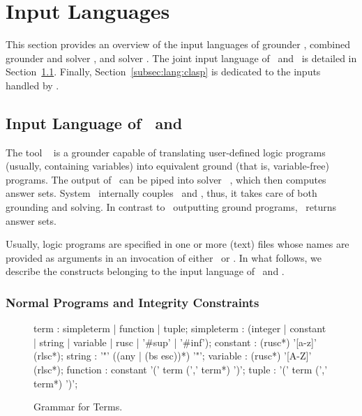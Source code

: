 \section{Input Languages}\label{sec:language}

This section provides an overview of the input languages of
grounder \gringo, combined grounder and solver \clingo, and solver \clasp.
The joint input language of \gringo\ and \clingo\ is detailed in
Section~\ref{subsec:lang:gringo}.
Finally, Section~\ref{subsec:lang:clasp} is dedicated to the inputs handled by \clasp.

\subsection{Input Language of \gringo\ and \clingo}\label{subsec:lang:gringo}

The tool \gringo~\cite{gescth07a} is a grounder capable of translating
user-defined logic programs (usually, containing variables) into
equivalent ground (that is, variable-free) programs.
The output of \gringo\ can be piped into solver \clasp~\cite{gekanesc07a,gekasc09c},
which then computes answer sets.
System \clingo\ internally couples \gringo\ and \clasp, thus,
it takes care of both grounding and solving.
In contrast to \gringo\ outputting ground programs,
\clingo\ returns answer sets.

Usually, logic programs are specified in one or more (text) files whose names are
provided as arguments
in an invocation of either \gringo\ or \clingo.
In what follows, we describe the
constructs belonging to the input language of \gringo\ and \clingo.

\subsubsection{Normal Programs and Integrity Constraints}\label{subsec:gringo:normal}

\begin{figure}
\vspace*{-19mm}
\railnontermfont{\rmfamily\itshape}%
\begin{rail}
  term        : simpleterm | function | tuple;
  simpleterm  : (integer | constant | string | variable | rusc | '\#sup' | '\#inf');
  constant    : (rusc*) '[a-z]' (rlsc*);
  string      : '"' ((any | (bs esc))*) '"';
  variable    : (rusc*) '[A-Z]' (rlsc*);
  function    : constant '(' term (',' term*) ')';
  tuple       :          '(' term (',' term*) ')';
\end{rail}
\caption{Grammar for Terms.\label{fig:terms}}
\end{figure}

